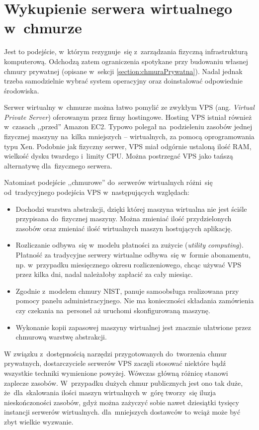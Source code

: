 \documentclass[12pt,a4paper,twoside,titlepage,openright]{book}
\begin{document}
\section{Wykupienie serwera wirtualnego w~chmurze}\label{section:podejscieVm}

Jest to podejście, w~którym rezygnuje~się z~zarządzania fizyczną infrastrukturą komputerową. Odchodzą zatem ograniczenia spotykane przy budowaniu własnej chmury prywatnej (opisane w~sekcji  \ref{section:chmuraPrywatna}). Nadal jednak trzeba samodzielnie wybrać system operacyjny oraz doinstalować odpowiednie środowiska.

Serwer wirtualny w~chmurze można łatwo pomylić ze zwykłym VPS (ang. \textit{Virtual Private Server}) oferowanym przez firmy hostingowe. Hosting VPS istniał również w~czasach ,,przed'' Amazon EC2. Typowo polegał na~podzieleniu zasobów jednej fizycznej maszyny na~kilka mniejszych -- wirtualnych, za pomocą oprogramowania typu Xen. Podobnie jak fizyczny serwer, VPS miał odgórnie ustaloną ilość RAM, wielkość dysku twardego i~limity CPU. Można postrzegać VPS jako tańszą alternatywę dla~fizycznego serwera. 

Natomiast podejście ,,chmurowe'' do~serwerów wirtualnych różni~się od~tradycyjnego podejścia VPS w~następujących względach:
\begin{itemize}
\item Dochodzi warstwa abstrakcji, dzięki której maszyna wirtualna nie jest ściśle przypisana do~fizycznej maszyny. Można zmieniać ilość przydzielonych zasobów oraz zmieniać ilość wirtualnych maszyn hostujących aplikację.
\item Rozliczanie odbywa~się w~modelu płatności za zużycie (\textit{utility computing}). Płatność za tradycyjne serwery wirtualne odbywa~się w~formie abonamentu, np. w~przypadku miesięcznego okresu rozliczeniowego, chcąc używać VPS przez kilka dni, nadal należałoby zapłacić za cały miesiąc.
\item Zgodnie z~modelem chmury NIST, panuje samoobsługa realizowana przy pomocy panelu administracyjnego. Nie ma konieczności składania zamówienia czy czekania na~personel aż uruchomi skonfigurowaną maszynę.
\item Wykonanie kopii zapasowej maszyny wirtualnej jest znacznie ułatwione przez chmurową warstwę abstrakcji. 
\end{itemize}

W związku z~dostępnością narzędzi przygotowanych do~tworzenia chmur prywatnych, dostarczyciele serwerów VPS zaczęli stosować niektóre bądź wszystkie techniki wymienione powyżej. Wówczas główną różnicę stanowi zaplecze zasobów. W~przypadku dużych chmur publicznych jest ono tak duże, że~dla~skalowania ilości maszyn wirtualnych w~górę tworzy~się iluzja nieskończoności zasobów, gdyż można zażyczyć sobie nawet dziesiątki tysięcy instancji serwerów wirtualnych. dla~mniejszych dostawców to wciąż może być zbyt wielkie wyzwanie.
\end{document}
